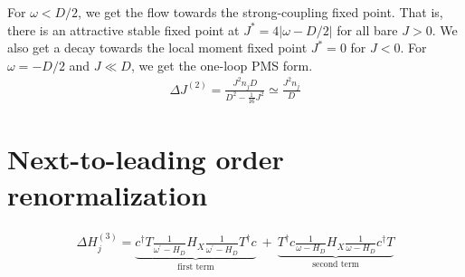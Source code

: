 \documentclass{revtex4-2}
\numberwithin{equation}{section}
\begin{document}
For \(\omega < D/2\), we get the flow towards the strong-coupling fixed point. That is, there is an attractive stable fixed point at \(J^* = 4|\omega - D/2|\) for all bare \(J > 0\). We also get a decay towards the local moment fixed point \(J^* = 0\) for \(J < 0\). For \(\omega = -D/2\) and \(J \ll D\), we get the one-loop PMS form. 
\begin{equation}\begin{aligned}
	\Delta J^{(2)} = \frac{J^2 n_j D}{D^2 - \frac{1}{16}J^2} \simeq \frac{J^2 n_j }{D}
\end{aligned}\end{equation}
\section{Next-to-leading order renormalization}
\begin{equation}\begin{aligned}
	\Delta H^{(3)}_j = \underbrace{c^\dagger T \frac{1}{\omega^\prime - H_D} H_X \frac{1}{\omega^\prime - H_D} T^\dagger c}_\text{first term} ~+~ \underbrace{T^\dagger c \frac{1}{\omega - H_D} H_X \frac{1}{\omega - H_D} c^\dagger T}_\text{second term}
\end{aligned}\end{equation}
\end{document}
